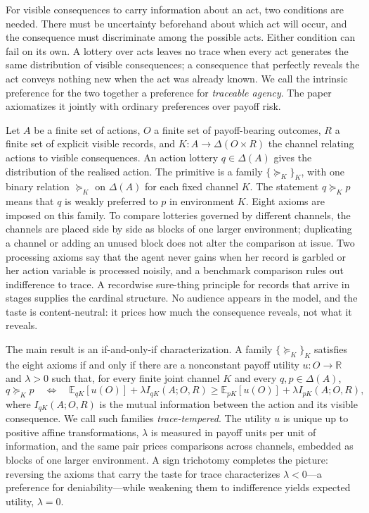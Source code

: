 \documentclass[11pt,a4paper]{article}
\theoremstyle{definition}
\newcommand{\E}{\mathbb E}
\newcommand{\1}{\mathbf 1}
\begin{document}
For visible consequences to carry information about an act, two conditions are needed.  There must be uncertainty
beforehand about which act will occur, and the consequence must discriminate among the
possible acts.  Either condition can fail on its own.  A lottery over acts leaves no trace when every act generates
the same distribution of visible consequences; a consequence that perfectly reveals the act conveys
nothing new when the act was already known.  We call the intrinsic preference for the two together a preference for \emph{traceable agency}.  The paper axiomatizes it jointly with ordinary
preferences over payoff risk.

Let $A$ be a finite set of actions, $O$ a finite set of payoff-bearing
outcomes, $R$ a finite set of explicit visible records, and $K:A\to\Delta(O\times R)$ the channel relating actions to
visible consequences.  An action lottery $q\in\Delta(A)$ gives the distribution of the realised action.  The primitive is a family
$\{\succeq_K\}_K$, with one binary relation $\succeq_K$ on $\Delta(A)$ for each fixed channel $K$.
The statement $q\succeq_Kp$ means that $q$ is weakly preferred to $p$ in environment $K$.  Eight axioms are
imposed on this family.  To compare lotteries governed
by different channels, the channels are placed side by side as blocks of one larger environment; duplicating a
channel or adding an unused block does not alter the comparison at issue.  Two processing axioms say that the agent never gains when her record is garbled or her action variable is processed noisily, and a benchmark comparison rules out indifference to trace. A recordwise sure-thing principle for records that arrive in stages supplies
the cardinal structure.  No audience appears in the model, and the
taste is content-neutral: it prices how much the consequence reveals, not what it reveals.

The main result is an if-and-only-if characterization.  A family $\{\succeq_K\}_K$ satisfies the eight axioms if and
only if there are a nonconstant payoff utility $u:O\to\mathbb R$ and $\lambda>0$ such that, for every finite joint
channel $K$ and every $q,p\in\Delta(A)$,
\[
 q\succeq_Kp
 \quad\Longleftrightarrow\quad
 \E_{qK}[u(O)]+\lambda I_{qK}(A;O,R)
 \ge
 \E_{pK}[u(O)]+\lambda I_{pK}(A;O,R),
\]
where $I_{qK}(A;O,R)$ is the mutual information between the action and its visible consequence.  We call such
families \emph{trace-tempered}.  The utility $u$ is unique up to positive affine transformations, $\lambda$ is
measured in payoff units per unit of information, and the same pair prices comparisons across channels, embedded
as blocks of one larger environment.  A sign trichotomy completes the picture: reversing the axioms that carry the
taste for trace characterizes $\lambda<0$---a preference for deniability---while weakening them to indifference
yields expected utility, $\lambda=0$. 
\end{document}
